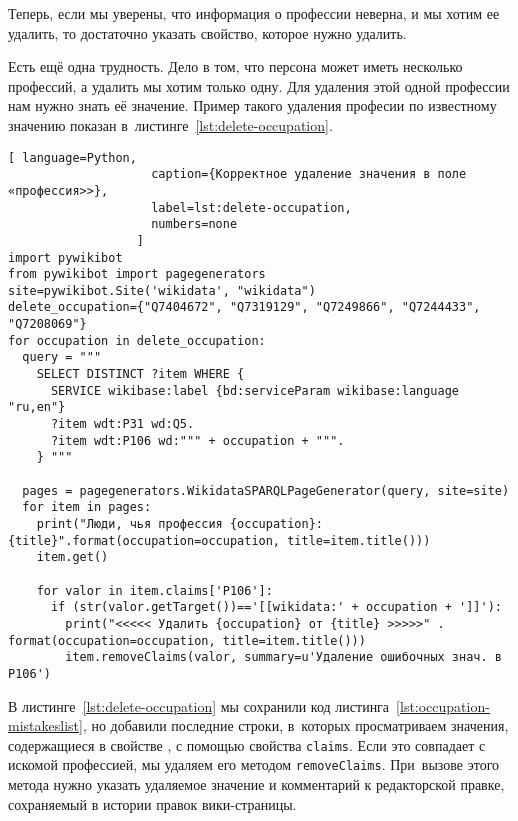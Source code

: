 Теперь, если мы уверены, что информация о профессии неверна, и мы хотим ее удалить, то достаточно указать свойство, которое нужно удалить.

Есть ещё одна трудность. 
Дело в том, что персона может иметь несколько профессий, а удалить мы хотим только одну. 
Для удаления этой одной профессии нам нужно знать её значение. 
Пример такого удаления професии по известному значению 
показан в~листинге~\ref{lst:delete-occupation}. 



\newpage
\begin{lstlisting}[ language=Python,
                    caption={Корректное удаление значения в поле «профессия>>},
                    label=lst:delete-occupation, 
                    numbers=none
                  ]
import pywikibot
from pywikibot import pagegenerators
site=pywikibot.Site('wikidata', "wikidata")
delete_occupation={"Q7404672", "Q7319129", "Q7249866", "Q7244433", 
"Q7208069"}
for occupation in delete_occupation:
  query = """
    SELECT DISTINCT ?item WHERE {
      SERVICE wikibase:label {bd:serviceParam wikibase:language "ru,en"}
      ?item wdt:P31 wd:Q5.
      ?item wdt:P106 wd:""" + occupation + """.
    } """

  pages = pagegenerators.WikidataSPARQLPageGenerator(query, site=site)
  for item in pages:
    print("Люди, чья профессия {occupation}: {title}".format(occupation=occupation, title=item.title()))
    item.get()

    for valor in item.claims['P106']:
      if (str(valor.getTarget())=='[[wikidata:' + occupation + ']]'):
        print("<<<<< Удалить {occupation} от {title} >>>>>" . format(occupation=occupation, title=item.title()))
        item.removeClaims(valor, summary=u'Удаление ошибочных знач. в P106')
\end{lstlisting} 


В листинге~\ref{lst:delete-occupation} 
мы сохранили код листинга~\ref{lst:occupation-mistakeslist}, 
но добавили последние строки, 
в~которых просматриваем значения, содержащиеся в свойстве , 
с помощью свойства \mbox{\lstinline|claims|.} 
Если это совпадает с искомой профессией, мы удаляем его методом \mbox{\lstinline|removeClaims|.} 
При~вызове этого метода нужно указать удаляемое значение и комментарий к редакторской правке, сохраняемый в истории правок вики-страницы.


